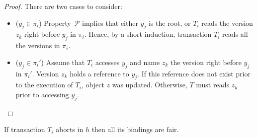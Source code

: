 \begin{proof}  

  There are two cases to consider:
  \begin{itemize}
  \item ($y_j \in \pi_i$)
    Property~$\mathcal{P}$ implies that either $y_j$ is the root, or $T_i$ reads the version $z_k$ right before $y_j$ in $\pi_i$.
    Hence, by a short induction, transaction $T_i$ reads all the versions in $\pi_i$.
  \item ($y_j \in \pi_i'$)
    Assume that $T_i$ accesses $y_j$ and name $z_k$ the version right before $y_j$ in $\pi_i'$.
    Version $z_k$ holds a reference to $y_j$.
    If this reference does not exist prior to the execution of $T_i$, object $z$ was updated.
    Otherwise, $T$ must reads $z_k$ prior to accessing $y_j$.
  \end{itemize}

\end{proof}

\begin{lemma}
  If transaction $T_i$ aborts in $h$ then all its bindings are fair.
\end{lemma}


